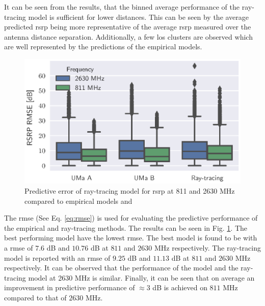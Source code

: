 It can be seen from the results, that the binned average performance of the ray-tracing model is sufficient for lower distances. This can be seen by the average predicted \gls{rsrp} being more representative of the average \gls{rsrp} measured over the antenna distance separation. Additionally, a few \gls{los} clusters are observed which are well represented by the predictions of the empirical models. 



\begin{figure}
    \centering
    \includegraphics{chapters/part_pathloss/figures/results/improved_boxplot_results_comparison_ghz.eps}
    \caption{Predictive error of ray-tracing model for \gls{rsrp} at 811 and 2630 MHz compared to empirical models  and }
    \label{fig:rmse_boxplot_rsrp_comparison}
\end{figure}


The \gls{rmse} (See Eq. \ref{eq:rmse}) is used for evaluating the predictive performance of the empirical and ray-tracing methods. The results can be seen in Fig. \ref{fig:rmse_boxplot_rsrp_comparison}. The best performing model have the lowest \gls{rmse}. The best model is found to be  with a \gls{rmse} of $7.6$ dB and $10.76$ dB at $811$ and $2630$ MHz respectively. The ray-tracing model is reported with an \gls{rmse} of $9.25$ dB and $11.13$ dB at $811$ and $2630$ MHz respectively. It can be observed that the performance of the  model and the ray-tracing model at 2630 MHz is similar. Finally, it can be seen that on average an improvement in predictive performance of $\approx 3$ dB is achieved on $811$ MHz compared to that of $2630$ MHz.



